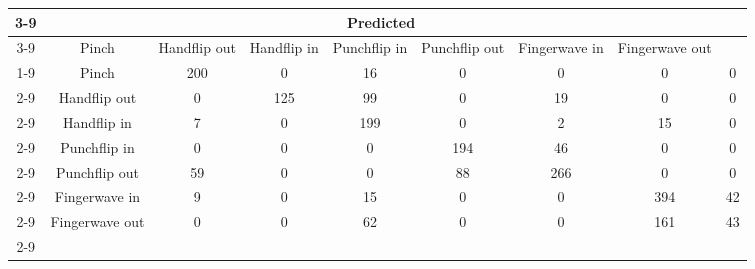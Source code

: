 \documentclass{standalone}
\begin{document}
 
 \begin{tabular}{|c |c |c |c |c |c |c |c |c |}
\cline{3-9}\multicolumn{2}{c|}{} & \multicolumn{7}{c|}{Predicted} \\ 
\cline{3-9} \multicolumn{2}{c |}{ } & Pinch & Handflip out & Handflip in & Punchflip in & Punchflip out & Fingerwave in & Fingerwave out\\ 
\cline{1-9}\multirow{7}{*}{\rotatebox[origin=c]{90}{Actual}} & Pinch & 200 & 0 & 16 & 0 & 0 & 0 & 0\\ 
 \cline{2-9} & Handflip out & 0 & 125 & 99 & 0 & 19 & 0 & 0\\ 
 \cline{2-9} & Handflip in & 7 & 0 & 199 & 0 & 2 & 15 & 0\\ 
 \cline{2-9} & Punchflip in & 0 & 0 & 0 & 194 & 46 & 0 & 0\\ 
 \cline{2-9} & Punchflip out & 59 & 0 & 0 & 88 & 266 & 0 & 0\\ 
 \cline{2-9} & Fingerwave in & 9 & 0 & 15 & 0 & 0 & 394 & 42\\ 
 \cline{2-9} & Fingerwave out & 0 & 0 & 62 & 0 & 0 & 161 & 43\\ 
 \cline{2-9}\hline \end{tabular}
 
\end{document}
